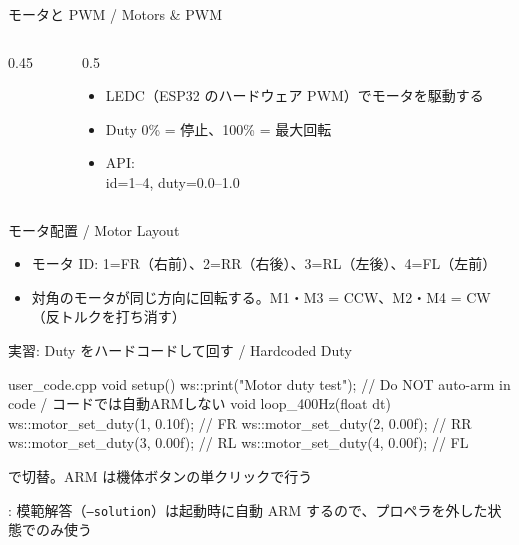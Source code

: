 \begin{frame}{モータと PWM / Motors \& PWM}
  \begin{columns}[T]
    \begin{column}{0.45\textwidth}
      \centering
      \resizebox{!}{0.62\textheight}{}
    \end{column}
    \begin{column}{0.5\textwidth}
      \vspace{1em}
      \begin{itemize}\small
        \item LEDC（ESP32 のハードウェア PWM）でモータを駆動する
        \item Duty 0\% = 停止、100\% = 最大回転
        \item API: \\
              \small id=1--4, duty=0.0--1.0
      \end{itemize}
    \end{column}
  \end{columns}
\end{frame}

\begin{frame}{モータ配置 / Motor Layout}
  \begin{center}
    \resizebox{0.4\textwidth}{!}{}
  \end{center}
  \begin{itemize}\small
    \item モータ ID: 1=FR（右前）、2=RR（右後）、3=RL（左後）、4=FL（左前）
    \item 対角のモータが同じ方向に回転する。M1・M3 = CCW、M2・M4 = CW（反トルクを打ち消す）
  \end{itemize}
\end{frame}

\begin{frame}[fragile]{実習: Duty をハードコードして回す / Hardcoded Duty}
  \begin{sflisting}[basicstyle=\ttfamily\scriptsize]{user\_code.cpp}
void setup() {
    ws::print("Motor duty test");
    // Do NOT auto-arm in code / コードでは自動ARMしない
}
void loop_400Hz(float dt) {
    ws::motor_set_duty(1, 0.10f);   // FR
    ws::motor_set_duty(2, 0.00f);   // RR
    ws::motor_set_duty(3, 0.00f);   // RL
    ws::motor_set_duty(4, 0.00f);   // FL
}
  \end{sflisting}

  {\footnotesize {} で切替。ARM は機体ボタンの単クリックで行う}

  \vspace{0.2em}

  {\footnotesize {}: 模範解答（\texttt{--solution}）は起動時に自動 ARM するので、プロペラを外した状態でのみ使う}
\end{frame}

